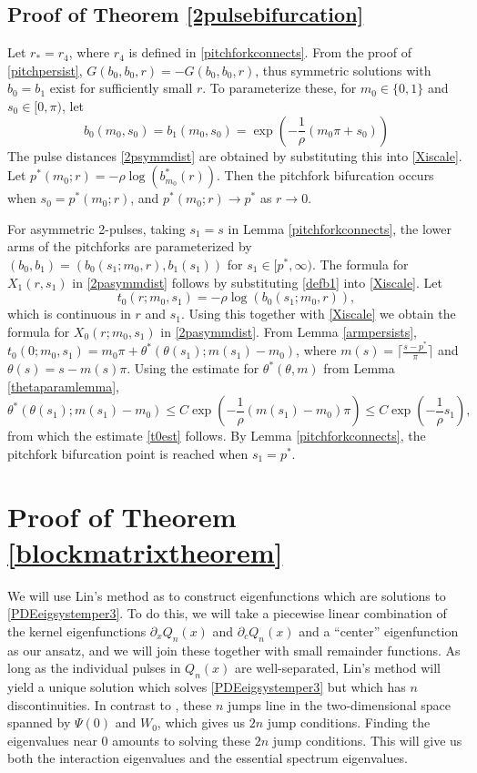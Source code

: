 \documentclass[10pt,reqno]{amsart}
\theoremstyle{plain}
\theoremstyle{definition}
\theoremstyle{remark}
\numberwithin{theorem}{section}
\numberwithin{equation}{section}
\begin{document}
\subsection{Proof of Theorem \ref{2pulsebifurcation}}

Let $r_* = r_4$, where $r_4$ is defined in \cref{pitchforkconnects}. From the proof of \cref{pitchpersist}, $G(b_0, b_0, r) = -G(b_0, b_0, r)$, thus symmetric solutions with $b_0 = b_1$ exist for sufficiently small $r$. To parameterize these, for $m_0 \in \{0, 1\}$ and $s_0 \in [0, \pi)$, let
\[
b_0(m_0, s_0) = b_1(m_0, s_0) = 
\exp\left( -\frac{1}{\rho}(m_0 \pi + s_0) \right)
\]
The pulse distances \cref{2psymmdist} are obtained by substituting this into \cref{Xiscale}. Let $p^*(m_0; r) = -\rho \log(b_{m_0}^*(r))$. Then the pitchfork bifurcation occurs when $s_0 = p^*(m_0; r)$, and $p^*(m_0; r) \rightarrow p^*$ as $r \rightarrow 0$.

For asymmetric 2-pulses, taking $s_1 = s$ in Lemma \ref{pitchforkconnects}, the lower arms of the pitchforks are parameterized by $(b_0, b_1) = (b_0(s_1; m_0, r), b_1(s_1))$ for $s_1 \in [p^*, \infty)$. The formula for $X_1(r, s_1)$ in \cref{2pasymmdist} follows by substituting \cref{defb1} into \cref{Xiscale}. Let 
\begin{equation}\label{deft0}
t_0(r; m_0, s_1) = -\rho \log\left( b_0(s_1; m_0, r) \right),
\end{equation}
which is continuous in $r$ and $s_1$. Using this together with \cref{Xiscale} we obtain the formula for $X_0(r; m_0, s_1)$ in \cref{2pasymmdist}. From Lemma \ref{armpersists}, $t_0(0; m_0, s_1) = m_0 \pi + \theta^*(\theta(s_1); m(s_1) - m_0)$, where $m(s) = \lceil \frac{s - p^*}{\pi} \rceil$ and $\theta(s) = s - m(s) \pi$. Using the estimate for $\theta^*(\theta, m)$ from Lemma \ref{thetaparamlemma},
\[
\theta^*(\theta(s_1); m(s_1) - m_0) \leq C \exp\left(-\frac{1}{\rho} ( m(s_1) - m_0 )\pi \right) \leq C \exp\left(-\frac{1}{\rho} s_1 \right),
\]
from which the estimate \cref{t0est} follows. By Lemma \ref{pitchforkconnects}, the pitchfork bifurcation point is reached when $s_1 = p^*$.

\section{Proof of Theorem \ref{blockmatrixtheorem}}\label{sec:blockmatrixproof}

We will use Lin's method as \cite{Sandstede1998} to construct eigenfunctions which are solutions to \cref{PDEeigsystemper3}. To do this, we will take a piecewise linear combination of the kernel eigenfunctions $\partial_x Q_n(x)$ and $\partial_c Q_n(x)$ and a ``center'' eigenfunction as our ansatz, and we will join these together with small remainder functions. As long as the individual pulses in $Q_n(x)$ are well-separated, Lin's method will yield a unique solution which solves \cref{PDEeigsystemper3} but which has $n$ discontinuities. In contrast to \cite{Sandstede1998}, these $n$ jumps line in the two-dimensional space spanned by $\Psi(0)$ and $W_0$, which gives us $2n$ jump conditions. Finding the eigenvalues near 0 amounts to solving these $2n$ jump conditions. This will give us both the interaction eigenvalues and the essential spectrum eigenvalues.
\end{document}
